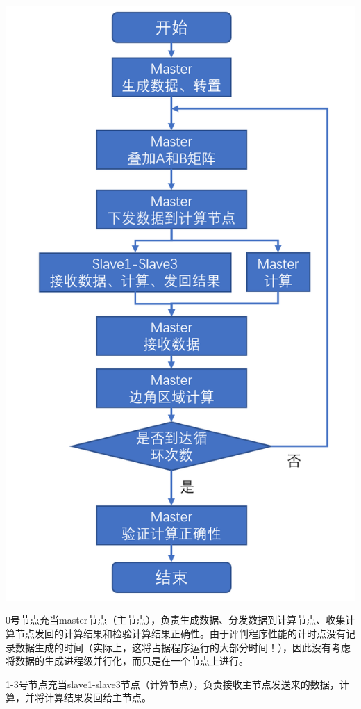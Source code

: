 \documentclass[UTF8,10pt]{ctexart}
\begin{document}
\begin{center}
    \includegraphics[scale=0.6]{img/2.PNG}
\end{center}

0号节点充当master节点（主节点），负责生成数据、分发数据到计算节点、收集计算节点发回的计算结果和检验计算结果正确性。由于评判程序性能的计时点没有记录数据生成的时间（实际上，这将占据程序运行的大部分时间！），因此没有考虑将数据的生成进程级并行化，而只是在一个节点上进行。

1-3号节点充当slave1-slave3节点（计算节点），负责接收主节点发送来的数据，计算，并将计算结果发回给主节点。
\end{document}
